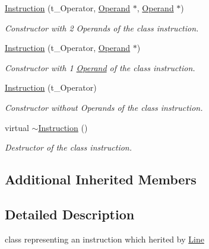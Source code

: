 \begin{DoxyCompactItemize}
\mbox{\hyperlink{class_instruction_a0b1ed4432c9c5823ee9e522c7d11bb5f}{Instruction}} (t\+\_\+\+Operator, \mbox{\hyperlink{class_operand}{Operand}} $\ast$, \mbox{\hyperlink{class_operand}{Operand}} $\ast$)
\begin{DoxyCompactList}\small\item\em Constructor with 2 Operands of the class instruction. \end{DoxyCompactList}\item 
\mbox{\label{class_instruction_a6ae2a4dd83500f9d538a653823161b1c}} 
\mbox{\hyperlink{class_instruction_a6ae2a4dd83500f9d538a653823161b1c}{Instruction}} (t\+\_\+\+Operator, \mbox{\hyperlink{class_operand}{Operand}} $\ast$)
\begin{DoxyCompactList}\small\item\em Constructor with 1 \mbox{\hyperlink{class_operand}{Operand}} of the class instruction. \end{DoxyCompactList}\item 
\mbox{\label{class_instruction_ab2d989cc18e9bf0eeee194a7614514fa}} 
\mbox{\hyperlink{class_instruction_ab2d989cc18e9bf0eeee194a7614514fa}{Instruction}} (t\+\_\+\+Operator)
\begin{DoxyCompactList}\small\item\em Constructor without Operands of the class instruction. \end{DoxyCompactList}\item 
\mbox{\label{class_instruction_a3f1031e811b710787678f8faf8cc9672}} 
virtual \mbox{\hyperlink{class_instruction_a3f1031e811b710787678f8faf8cc9672}{$\sim$\+Instruction}} ()
\begin{DoxyCompactList}\small\item\em Destructor of the class instruction. \end{DoxyCompactList}\end{DoxyCompactItemize}
\subsection*{Additional Inherited Members}


\subsection{Detailed Description}
class representing an instruction which herited by \mbox{\hyperlink{class_line}{Line}} 

